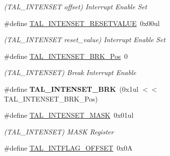 \begin{DoxyCompactItemize}
\begin{DoxyCompactList}\small\item\em (T\+A\+L\+\_\+\+I\+N\+T\+E\+N\+S\+E\+T offset) Interrupt Enable Set \end{DoxyCompactList}\item 
\hypertarget{group___s_a_m_l21___t_a_l_gadb93aeda29dfc71ce07a2f39e9dde485}{}\#define \hyperlink{group___s_a_m_l21___t_a_l_gadb93aeda29dfc71ce07a2f39e9dde485}{T\+A\+L\+\_\+\+I\+N\+T\+E\+N\+S\+E\+T\+\_\+\+R\+E\+S\+E\+T\+V\+A\+L\+U\+E}~0x00ul\label{group___s_a_m_l21___t_a_l_gadb93aeda29dfc71ce07a2f39e9dde485}

\begin{DoxyCompactList}\small\item\em (T\+A\+L\+\_\+\+I\+N\+T\+E\+N\+S\+E\+T reset\+\_\+value) Interrupt Enable Set \end{DoxyCompactList}\item 
\hypertarget{group___s_a_m_l21___t_a_l_ga4c723443cb818f1f0534148f2ace6c5f}{}\#define \hyperlink{group___s_a_m_l21___t_a_l_ga4c723443cb818f1f0534148f2ace6c5f}{T\+A\+L\+\_\+\+I\+N\+T\+E\+N\+S\+E\+T\+\_\+\+B\+R\+K\+\_\+\+Pos}~0\label{group___s_a_m_l21___t_a_l_ga4c723443cb818f1f0534148f2ace6c5f}

\begin{DoxyCompactList}\small\item\em (T\+A\+L\+\_\+\+I\+N\+T\+E\+N\+S\+E\+T) Break Interrupt Enable \end{DoxyCompactList}\item 
\hypertarget{group___s_a_m_l21___t_a_l_gabf246a8cac8eaf3c3d764a8187394002}{}\#define {\bfseries T\+A\+L\+\_\+\+I\+N\+T\+E\+N\+S\+E\+T\+\_\+\+B\+R\+K}~(0x1ul $<$$<$ T\+A\+L\+\_\+\+I\+N\+T\+E\+N\+S\+E\+T\+\_\+\+B\+R\+K\+\_\+\+Pos)\label{group___s_a_m_l21___t_a_l_gabf246a8cac8eaf3c3d764a8187394002}

\item 
\hypertarget{group___s_a_m_l21___t_a_l_ga5915ea7a9765c7b5d50ec4d2fa4070ec}{}\#define \hyperlink{group___s_a_m_l21___t_a_l_ga5915ea7a9765c7b5d50ec4d2fa4070ec}{T\+A\+L\+\_\+\+I\+N\+T\+E\+N\+S\+E\+T\+\_\+\+M\+A\+S\+K}~0x01ul\label{group___s_a_m_l21___t_a_l_ga5915ea7a9765c7b5d50ec4d2fa4070ec}

\begin{DoxyCompactList}\small\item\em (T\+A\+L\+\_\+\+I\+N\+T\+E\+N\+S\+E\+T) M\+A\+S\+K Register \end{DoxyCompactList}\item 
\hypertarget{group___s_a_m_l21___t_a_l_ga1bbafd8b72c8e79d0e859d012af922cb}{}\#define \hyperlink{group___s_a_m_l21___t_a_l_ga1bbafd8b72c8e79d0e859d012af922cb}{T\+A\+L\+\_\+\+I\+N\+T\+F\+L\+A\+G\+\_\+\+O\+F\+F\+S\+E\+T}~0x0\+A\label{group___s_a_m_l21___t_a_l_ga1bbafd8b72c8e79d0e859d012af922cb}


\end{DoxyCompactItemize}
